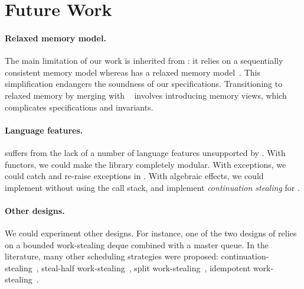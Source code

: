\section{Future Work}
\label{sec:future_work}

\paragraph{Relaxed memory model.}

The main limitation of our work is inherited from \Zoo: it relies on a sequentially consistent memory model whereas \OCamlFive has a relaxed memory model~\citep{DBLP:conf/pldi/DolanSM18}.
This simplification endangers the soundness of our specifications.
Transitioning to relaxed memory by merging \Zoo with \Cosmo~\citep{DBLP:journals/pacmpl/MevelJP20,DBLP:journals/pacmpl/MevelJ21} involves introducing memory views, which complicates specifications and invariants.

\paragraph{Language features.}

\Parabs suffers from the lack of a number of language features unsupported by \Zoo.
With functors, we could make the \Parabs library completely modular.
With exceptions, we could catch and re-raise exceptions in .
With algebraic effects, we could implement  without using the call stack, and implement \emph{continuation stealing} for .

%

\paragraph{Other designs.}

We could experiment other designs.
For instance, one of the two designs of \Moonpool relies on a bounded work-stealing deque combined with a master queue.
In the literature, many other scheduling strategies were proposed: continuation-stealing~\citep{DBLP:conf/ipps/SchmausPSHN21,DBLP:journals/tpds/WilliamsE25}, steal-half work-stealing~\citep{DBLP:conf/podc/HendlerS02}, split work-stealing~\citep{DBLP:conf/sc/DinanLSKN09,DBLP:journals/scheduling/RitoP22,DBLP:conf/europar/DijkP14,DBLP:conf/spaa/CustodioPR23,DBLP:conf/icpp/CartierDL21}, idempotent work-stealing~\citep{DBLP:conf/ppopp/MichaelVS09}.
